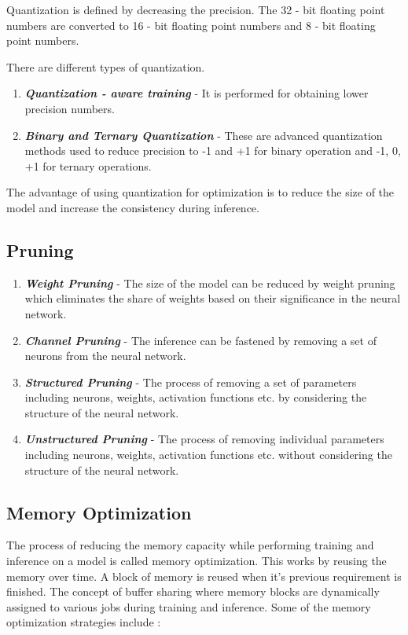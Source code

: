 \documentclass[sigconf]{acmart}
\begin{document}
Quantization is defined by decreasing the precision. The 32 - bit floating point numbers are converted to 16 - bit floating point numbers and 8 - bit floating point numbers.

There are different types of quantization.
\begin{enumerate}
    \item\textit{\textbf{Quantization - aware training}} - It is performed for obtaining lower precision numbers. 
    \item\textbf{\textit{Binary and Ternary Quantization}} - These are advanced quantization methods used to reduce precision to -1 and +1 for binary operation and -1, 0, +1 for ternary operations.

\end{enumerate}

The advantage of using quantization for optimization is to reduce the size of the model and increase the consistency during inference.

\subsection{Pruning}

\begin{enumerate}
    \item \textbf{\textit{Weight Pruning}} - The size of the model can be reduced by weight pruning which eliminates the share of weights based on their significance in the neural network.
    \item \textit{\textbf{Channel Pruning}} - The inference can be fastened by removing a set of neurons from the neural network.
    \item \textbf{\textit{Structured Pruning}} - The process of removing a set of parameters including neurons, weights, activation functions etc. by considering the structure of the neural network.
    \item \textbf{\textit{Unstructured Pruning}} - The process of removing individual parameters including neurons, weights, activation functions etc. without considering the structure of the neural network.
    
\end{enumerate}

\subsection{Memory Optimization}

The process of reducing the memory capacity while performing training and inference on a model is called memory optimization. This works by reusing the memory over time. A block of memory is reused when it's previous requirement is finished. The concept of buffer sharing where memory blocks are dynamically assigned to various jobs during training and inference.
Some of the memory optimization strategies include :
\end{document}

